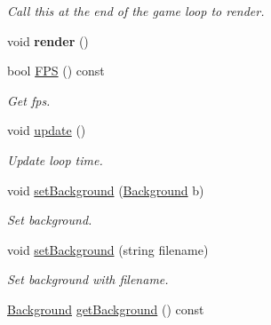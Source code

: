 \begin{DoxyCompactItemize}
\begin{DoxyCompactList}\small\item\em Call this at the end of the game loop to render. \end{DoxyCompactList}\item 
void {\bfseries render} ()\hypertarget{classEngine_a7960743aefd62e846e7f3cd92c18bc73}{}\label{classEngine_a7960743aefd62e846e7f3cd92c18bc73}

\item 
bool \hyperlink{classEngine_a5932cbe5ddf7772028bb6250c5ce75fc}{F\+PS} () const \hypertarget{classEngine_a5932cbe5ddf7772028bb6250c5ce75fc}{}\label{classEngine_a5932cbe5ddf7772028bb6250c5ce75fc}

\begin{DoxyCompactList}\small\item\em Get fps. \end{DoxyCompactList}\item 
void \hyperlink{classEngine_ad2ff110d5a86c1cd60b541d65915ac48}{update} ()\hypertarget{classEngine_ad2ff110d5a86c1cd60b541d65915ac48}{}\label{classEngine_ad2ff110d5a86c1cd60b541d65915ac48}

\begin{DoxyCompactList}\small\item\em Update loop time. \end{DoxyCompactList}\item 
void \hyperlink{classEngine_a690ac76faed3d2a9f1f582a2e6fc8c85}{set\+Background} (\hyperlink{classBackground}{Background} b)\hypertarget{classEngine_a690ac76faed3d2a9f1f582a2e6fc8c85}{}\label{classEngine_a690ac76faed3d2a9f1f582a2e6fc8c85}

\begin{DoxyCompactList}\small\item\em Set background. \end{DoxyCompactList}\item 
void \hyperlink{classEngine_a376e4a1ba9adc079e1da9b28a290abd2}{set\+Background} (string filename)\hypertarget{classEngine_a376e4a1ba9adc079e1da9b28a290abd2}{}\label{classEngine_a376e4a1ba9adc079e1da9b28a290abd2}

\begin{DoxyCompactList}\small\item\em Set background with filename. \end{DoxyCompactList}\item 
\hyperlink{classBackground}{Background} \hyperlink{classEngine_aa9398f6b48392dc520ab8c529e1d10c4}{get\+Background} () const \hypertarget{classEngine_aa9398f6b48392dc520ab8c529e1d10c4}{}\label{classEngine_aa9398f6b48392dc520ab8c529e1d10c4}


\end{DoxyCompactItemize}
